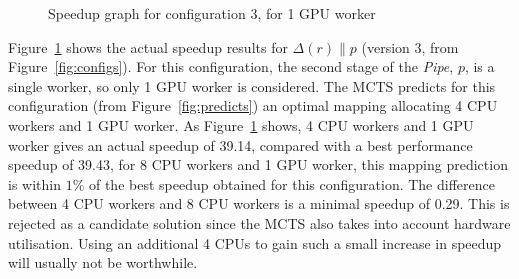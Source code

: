 \documentclass[smallextended]{svjour3}
\begin{document}
\begin{figure}
\begin{center}
\caption{Speedup graph for configuration 3, for 1 GPU worker}
\label{ver1}
\end{center}
\end{figure}
Figure~\ref{ver1} shows the actual speedup results for $ \Delta(r) \parallel p $ (version 3, from Figure~\ref{fig:configs}).
For this configuration, the second stage of the \emph{Pipe}, $p$, is a single worker, so only 1 GPU worker is considered.
The MCTS predicts for this configuration (from Figure~\ref{fig:predicts}) an optimal mapping allocating 4 CPU workers and 1 GPU worker. As Figure~\ref{ver1} shows, 
4 CPU workers and 1 GPU worker gives an actual speedup of 39.14, compared with a best performance speedup of 39.43, for 8 CPU workers and 1 GPU worker, this mapping prediction is within $1\%$ of the best speedup obtained for this configuration.
The difference between 4 CPU workers and 8 CPU workers is a minimal speedup of 0.29.
This is rejected as a candidate solution since the MCTS also takes into account hardware utilisation.
Using an additional 4 CPUs to gain such a small increase in speedup will usually not be worthwhile. 
\end{document}
